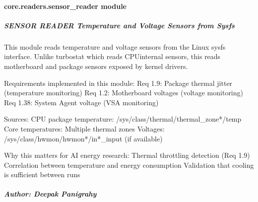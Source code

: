 \documentclass[letterpaper,10pt,english]{sphinxmanual}
\begin{document}
\sphinxstepscope


\paragraph{core.readers.sensor\_reader module}
\label{\detokenize{core.readers.sensor_reader:module-core.readers.sensor_reader}}\label{\detokenize{core.readers.sensor_reader:core-readers-sensor-reader-module}}\label{\detokenize{core.readers.sensor_reader::doc}}

\subparagraph{SENSOR READER \sphinxhyphen{} Temperature and Voltage Sensors from Sysfs}
\label{\detokenize{core.readers.sensor_reader:sensor-reader-temperature-and-voltage-sensors-from-sysfs}}
\sphinxAtStartPar
This module reads temperature and voltage sensors from the Linux sysfs interface.
Unlike turbostat which reads CPU\sphinxhyphen{}internal sensors, this reads motherboard and
package sensors exposed by kernel drivers.

\sphinxAtStartPar
Requirements implemented in this module:
\sphinxhyphen{} Req 1.9: Package thermal jitter (temperature monitoring)
\sphinxhyphen{} Req 1.2: Motherboard voltages (voltage monitoring)
\sphinxhyphen{} Req 1.38: System Agent voltage (VSA monitoring)

\sphinxAtStartPar
Sources:
\sphinxhyphen{} CPU package temperature: /sys/class/thermal/thermal\_zone*/temp
\sphinxhyphen{} Core temperatures: Multiple thermal zones
\sphinxhyphen{} Voltages: /sys/class/hwmon/hwmon*/in*\_input (if available)

\sphinxAtStartPar
Why this matters for AI energy research:
\sphinxhyphen{} Thermal throttling detection (Req 1.9)
\sphinxhyphen{} Correlation between temperature and energy consumption
\sphinxhyphen{} Validation that cooling is sufficient between runs


\subparagraph{Author: Deepak Panigrahy}
\label{\detokenize{core.readers.sensor_reader:author-deepak-panigrahy}}
\end{document}

